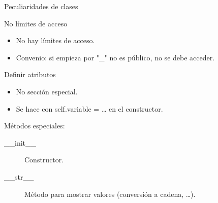 \documentclass[bigger,unknownkeysallowed]{beamer}
\begin{document}
\begin{frame}[label={sec:org0a6f7e9}]{Peculiaridades de clases}
\begin{block}{No límites de acceso}
\begin{itemize}
\item No hay límites de acceso.

\item Convenio: si empieza por "\_" no es público, no se debe acceder.
\end{itemize}
\end{block}

\begin{block}{Definir atributos}
\begin{itemize}
\item No sección especial.

\item Se hace con \alert{self.variable = \ldots{}} en el constructor.
\end{itemize}
\end{block}

\begin{block}{Métodos especiales:}
\begin{description}
\item[{\_\_init\_\_}] Constructor.

\item[{\_\_str\_\_}] Método para mostrar valores (conversión a cadena, \ldots{}).
\end{description}
\end{block}
\end{frame}
\end{document}
